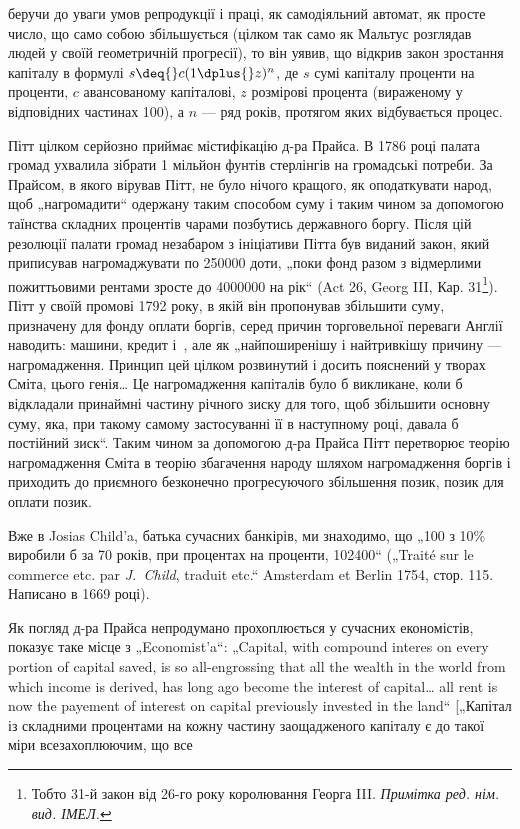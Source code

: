 \parcont{}  %
беручи до уваги умов репродукції і праці, як самодіяльний
автомат, як просте число, що само собою збільшується (цілком
так само як Мальтус розглядав людей у своїй геометричній
прогресії), то він уявив, що відкрив закон зростання капіталу
в формулі $s \deq{} c (1 \dplus{} z)^n$, де $s$ \deq{} сумі капіталу \dplus{} проценти на
проценти, $c$ \deq{} авансованому капіталові, $z$ \deq{} розмірові процента
(вираженому у відповідних частинах 100), а $n$ — ряд років, протягом
яких відбувається процес.

Пітт цілком серйозно приймає містифікацію д-ра Прайса.
В 1786 році палата громад ухвалила зібрати 1 мільйон фунтів стерлінгів
на громадські потреби. За Прайсом, в якого вірував Пітт,
не було нічого кращого, як оподаткувати народ, щоб „нагромадити“
одержану таким способом суму і таким чином за допомогою
таїнства складних процентів чарами позбутись державного
боргу. Після цій резолюції палати громад незабаром з ініціативи
Пітта був виданий закон, який приписував нагромаджувати по
\num{250000} доти, „поки фонд разом з відмерлими
пожиттьовими рентами зросте до \num{4000000}
на рік“ (Act 26, Georg III, Кар. 31\footnote*{
Тобто 31-й закон від 26-го року королювання Георга III.
\emph{Примітка ред. нім. вид. ІМЕЛ.}
}). Пітт у своїй промові 1792 року,
в якій він пропонував збільшити суму, призначену для фонду
оплати боргів, серед причин торговельної переваги Англії наводить:
машини, кредит і~, але як „найпоширенішу і найтривкішу
причину — нагромадження. Принцип цей цілком розвинутий
і досить пояснений у творах Сміта, цього генія\dots{} Це нагромадження
капіталів було б викликане, коли б відкладали принаймні
частину річного зиску для того, щоб збільшити основну
суму, яка, при такому самому застосуванні її в наступному році,
давала б постійний зиск“. Таким чином за допомогою д-ра Прайса
Пітт перетворює теорію нагромадження Сміта в теорію збагачення
народу шляхом нагромадження боргів і приходить до
приємного безконечно прогресуючого збільшення позик, позик
для оплати позик.

Вже в Josias Child’a, батька сучасних банкірів, ми знаходимо,
що „100 з 10\% виробили б за 70 років, при
процентах на проценти, \num{102400}“ („Traité sur le
commerce etc. par \emph{J.~Child}, traduit etc.“ Amsterdam et Berlin
1754, стор. 115. Написано в 1669 році).

Як погляд д-ра Прайса непродумано прохоплюється у сучасних
економістів, показує таке місце з „Economist’a“: „Capital,
with compound interes on every portion of capital saved, is so
all-engrossing that all the wealth in the world from which income
is derived, has long ago become the interest of capital\dots{} all rent is
now the payement of interest on capital previously invested in the
land“ [„Капітал із складними процентами на кожну частину заощадженого
капіталу є до такої міри всезахоплюючим, що все
\parbreak{}  %
